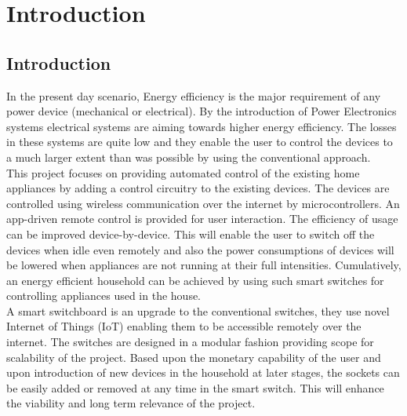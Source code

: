 \chapter{Introduction}
        \section{Introduction}
        
        In the present day scenario, Energy efficiency is the major requirement of any power device (mechanical or electrical). By the introduction of Power Electronics systems electrical systems are aiming towards higher energy efficiency. The losses in these systems are quite low and they enable the user to control the devices to a much larger extent than was possible by using the conventional approach. \\
        
        This project focuses on providing automated control of the existing home appliances by adding a control circuitry to the existing devices. The devices are controlled using wireless communication over the internet by microcontrollers. An app-driven remote control is provided for user interaction. The efficiency of usage can be improved device-by-device. This will enable the user to switch off the devices when idle even remotely and also the power consumptions of devices will be lowered when appliances are not running at their full intensities. Cumulatively, an energy efficient household can be achieved by using such smart switches for controlling appliances used in the house. \\
        
        A smart switchboard is an upgrade to the conventional switches, they use novel Internet of Things (IoT) enabling them to be accessible remotely over the internet. The switches are designed in a modular fashion providing scope for scalability of the project. Based upon the monetary capability of the user and upon introduction of new devices in the household at later stages, the sockets can be easily added or removed at any time in the smart switch. This will enhance the viability and long term relevance of the project.\\ \newpage
        
